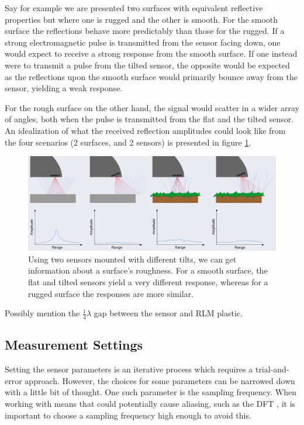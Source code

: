 Say for example we are presented two surfaces with equivalent reflective properties but where one is rugged and the other is smooth. For the smooth surface the reflections behave more predictably than those for the rugged. If a strong electromagnetic pulse is transmitted from the sensor facing down, one would expect to receive a strong response from the smooth surface. If one instead were to transmit a pulse from the tilted sensor, the opposite would be expected as the reflections upon the smooth surface would primarily bounce away from the sensor, yielding a weak response.

For the rough surface on the other hand, the signal would scatter in a wider array of angles, both when the pulse is transmitted from the flat and the tilted sensor. An idealization of what the received reflection amplitudes could look like from the four scenarios (2 surfaces, and 2 sensors) is presented in figure \ref{fig:reflections}.

\begin{figure}[h]
	\centering
	\includegraphics[scale=0.9]{figs_temp/reflections.jpg}
	\caption{Using two sensors mounted with different tilts, we can get information about a surface's roughness. For a smooth surface, the flat and tilted sensors yield a very different response, whereas for a rugged surface the responses are more similar.}
	\label{fig:reflections}
\end{figure}

Possibly mention the $\frac14\lambda$ gap between the sensor and RLM plastic.


\subsection*{Measurement Settings}
Setting the sensor parameters is an iterative process which requires a trial-and-error approach. However, the choices for some parameters can be narrowed down with a little bit of thought. One such parameter is the sampling frequency. When working with means that could potentially cause aliasing, such as the DFT \citep{lindgren_rootzeŽn_sandsten_2013}, it is important to choose a sampling frequency high enough to avoid this.

